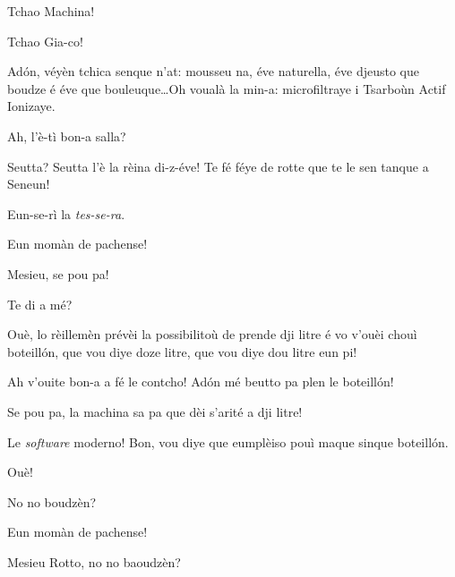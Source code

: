 \begin{drama}

\Giacospeaks{} Tchao Machina!

\Machinaspeaks {} Tchao Gia-co!

\Giacospeaks Ad\'on, véyèn tchica senque n’at: mousseu na, éve naturella, éve djeusto que boudze é éve que bouleuque\ldots Oh voualà la min-a: microfiltraye i Tsarboùn Actif Ionizaye.

\Giadaspeaks Ah, l’è-tì bon-a salla?

\Giacospeaks{} Seutta? Seutta l'è la rèina di-z-éve! Te fé féye de rotte que te le sen tanque a Seneun! 

\Machinaspeaks  Eun-se-rì la \textit{tes-se-ra}.

\Giacospeaks Eun momàn de pachense!



\Valletspeaks {} Mesieu, se pou pa! 

\Giacospeaks Te di a mé?

\Valletspeaks Ouè, lo rèillemèn prévèi la possibilitoù de prende dji litre é vo v'ouèi chouì boteill\'on, que vou diye doze litre, que vou diye dou litre eun pi!

\Giacospeaks Ah v'ouite bon-a a fé le contcho! Ad\'on mé beutto pa plen le boteill\'on!

\Valletspeaks Se pou pa, la machina sa pa que dèi s'arité a dji litre!

\Giacospeaks{} Le \textit{software} moderno! Bon, vou diye que eumplèiso pouì maque sinque boteill\'on.

\Valletspeaks Ouè!


\Valletspeaks No no boudzèn?

\Giacospeaks Eun momàn de pachense!

\Giadaspeaks Mesieu Rotto, no no baoudzèn?


\end{drama}
